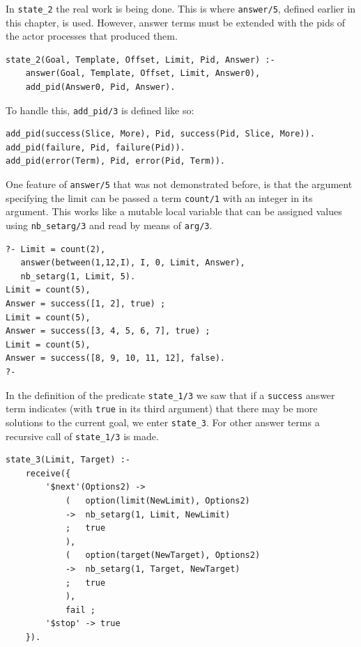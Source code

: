 \noindent In \texttt{state\_2} the real work is being done. This is where \texttt{answer/5}, defined earlier in this chapter, is used. However, answer terms must be extended with the pids of the actor processes that produced them. 

\begin{verbatim}
state_2(Goal, Template, Offset, Limit, Pid, Answer) :-
    answer(Goal, Template, Offset, Limit, Answer0),
    add_pid(Answer0, Pid, Answer).
\end{verbatim}

\noindent To handle this, \texttt{add\_pid/3} is defined like so:

\begin{verbatim}
add_pid(success(Slice, More), Pid, success(Pid, Slice, More)).
add_pid(failure, Pid, failure(Pid)).
add_pid(error(Term), Pid, error(Pid, Term)).
\end{verbatim}

\noindent One feature of \texttt{answer/5} that was not demonstrated before, is that the argument specifying the limit can be passed a term \texttt{count/1} with an integer in its argument. This works like a mutable local variable that can be assigned values using \texttt{nb\_setarg/3} and read by means of \texttt{arg/3}.

\begin{verbatim}
?- Limit = count(2),
   answer(between(1,12,I), I, 0, Limit, Answer),
   nb_setarg(1, Limit, 5).
Limit = count(5),
Answer = success([1, 2], true) ;
Limit = count(5),
Answer = success([3, 4, 5, 6, 7], true) ;
Limit = count(5),
Answer = success([8, 9, 10, 11, 12], false).
?-
\end{verbatim}

\noindent In the definition of the predicate \texttt{state\_1/3} we saw that if a \texttt{success} answer term indicates (with \texttt{true} in its third argument) that there may be more solutions to the current goal, we enter \texttt{state\_3}. For other answer terms a recursive call of \texttt{state\_1/3} is made.

\begin{verbatim}
state_3(Limit, Target) :-
    receive({
        '$next'(Options2) ->
            (   option(limit(NewLimit), Options2)
            ->  nb_setarg(1, Limit, NewLimit)
            ;   true
            ),
            (   option(target(NewTarget), Options2)
            ->  nb_setarg(1, Target, NewTarget)
            ;   true
            ),                                                         
            fail ;
        '$stop' -> true
    }).
\end{verbatim}

